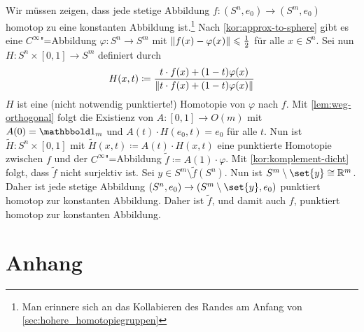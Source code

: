 \begin{beweis}
	Wir müssen zeigen, dass jede stetige Abbildung $f \colon (S^n, e_0) \to (S^m, e_0)$ homotop zu eine konstanten Abbildung ist.\footnote{Man erinnere sich an das Kollabieren des Randes am Anfang von \cref{sec:hohere_homotopiegruppen}} 
	Nach \cref{kor:approx-to-sphere} gibt es eine $C^\infty$"=Abbildung $\varphi \colon S^n \to S^m$ mit $\Vert f(x)- \varphi(x)\Vert \leqslant \frac{1}{2}$ für alle $x \in S^n$. 
	Sei nun $H \colon S^n \times [0,1] \to S^m$ definiert durch
	\[
		H(x,t) \coloneqq \frac{t \cdot f(x)+ (1-t)\varphi(x)}{\Vert t \cdot f(x) + (1-t) \varphi(x)\Vert} 
	\]
	$H$ ist eine (nicht notwendig punktierte!) Homotopie von $\varphi$ nach $f$. 
	Mit \cref{lem:weg-orthogonal} folgt die Existienz von $A \colon [0,1] \to O(m)$ mit $A(0)= \ind_m$ und
	$A(t) \cdot H(e_0,t) = e_0$ für alle $t$. 
	Nun ist $\tilde{H} \colon S^n \times [0,1]$ mit $\tilde{H}(x,t) \coloneqq A(t) \cdot H(x,t)$ eine punktierte Homotopie zwischen $f$ und der $C^\infty$"=Abbildung $\tilde{f} \coloneqq A(1) \cdot \varphi$. 
	Mit \cref{kor:komplement-dicht} folgt, dass $\tilde{f}$ nicht surjektiv ist. 
	Sei $y \in S^m \setminus \tilde{f}(S^n)$. 
	Nun ist $S^m \setminus \set{y} \cong \mathbb{R}^m$. 
	Daher ist jede stetige Abbildung $(S^n, e_0) \to (S^m \setminus \set{y} ,e_0)$ punktiert homotop zur konstanten Abbildung. Daher ist $\tilde{f}$, und damit auch $f$, punktiert homotop zur konstanten Abbildung.
\end{beweis}
\cleardoubleoddemptypage
{}
\setcounter{page}{1}
\cleardoubleoddemptypage
\appendix

\section{Anhang} %
\label{sec:anhang}

\printindex
\printbibliography
\listoffigures

